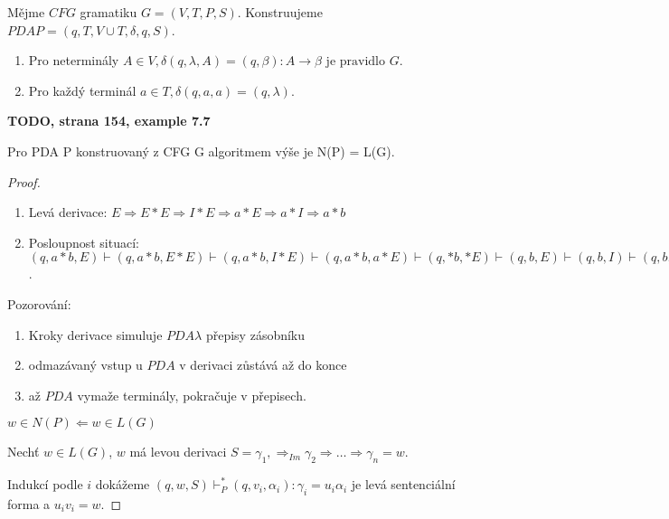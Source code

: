 \documentclass[../main.tex]{subfiles}
\begin{document}
    \begin{algorithm}
        Mějme $CFG$ gramatiku $G = (V,T,P,S)$. Konstruujeme $PDA P = ({q}, T,V\cup T, \delta, q,S)$.
        \begin{enumerate}
            \item Pro neterminály $A \in V, \delta(q,\lambda, A) = {(q,\beta) : A \rightarrow \beta \text{ je pravidlo }G}$.
            \item Pro každý terminál $a \in T, \delta(q,a,a) = {(q,\lambda)}$.
        \end{enumerate}
    \end{algorithm}

    \begin{example}
        \textbf{TODO, strana 154, example 7.7}
    \end{example}

    \begin{theorem}
        Pro PDA P konstruovaný z CFG G algoritmem výše je N(P) = L(G).
    \end{theorem}
    \begin{proof}
        \begin{enumerate}
            \item Levá derivace: $E \Rightarrow E * E \Rightarrow I * E \Rightarrow a*E \Rightarrow a*I \Rightarrow a*b$
            \item Posloupnost situací: $(q,a*b,E)\vdash (q,a*b,E*E)\vdash (q,a*b,I*E)\vdash (q,a*b,a*E)\vdash (q,*b,*E)\vdash(q,b,E)\vdash(q,b,I)\vdash(q,b,b)\vdash(q,\lambda,\lambda)$.
        \end{enumerate}    

        Pozorování:
        \begin{enumerate}
            \item Kroky derivace simuluje $PDA \lambda$ přepisy zásobníku
            \item odmazávaný vstup u $PDA$ v derivaci zůstává až do konce
            \item až $PDA$ vymaže terminály, pokračuje v přepisech.
        \end{enumerate}


        $w\in N(P) \Leftarrow w\in L(G)$

        Nechť $w\in L(G)$, $w$ má levou derivaci $S = \gamma_1, \Rightarrow_{Im} \gamma_2 \Rightarrow \dots \Rightarrow \gamma_n = w.$

        Indukcí podle $i$ dokážeme $(q,w,S)\vdash^*_P (q,v_i,\alpha_i) : \gamma_i = u_i \alpha_i$ je levá sentenciální forma a $u_iv_i = w$.
    \end{proof}
\end{document}
